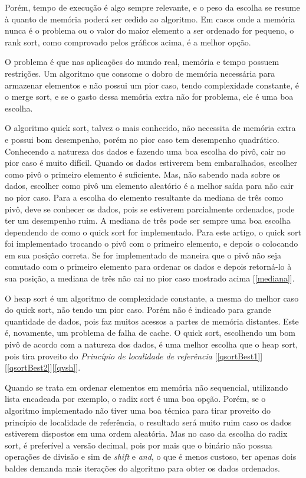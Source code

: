 \documentclass[fleqn,10pt]{SelfArx} %
\begin{document}
Porém, tempo de execução é algo sempre relevante, e o peso da escolha se resume à quanto de memória poderá ser 
cedido ao algoritmo. Em casos onde a memória nunca é o problema ou o valor do maior elemento a ser ordenado for 
pequeno, o rank sort, como comprovado pelos gráficos acima, é a melhor opção.

O problema é que nas aplicações do mundo real, memória e tempo possuem restrições. Um algoritmo que consome o dobro de 
memória necessária para armazenar elementos e não possui um pior caso, tendo complexidade constante, é o merge sort, e 
se o gasto dessa memória extra não for problema, ele é uma boa escolha. 

O algoritmo quick sort, talvez o mais conhecido, não necessita de memória extra e possui bom desempenho, porém no 
pior caso tem desempenho quadrático. Conhecendo a natureza dos dados e fazendo uma boa escolha do pivô, cair no 
pior caso é muito difícil. Quando os dados estiverem bem embaralhados, escolher como pivô o primeiro elemento é suficiente. 
Mas, não sabendo nada sobre os dados, escolher como pivô um elemento aleatório é a melhor saída para não cair no pior caso. 
Para a escolha do elemento resultante da mediana de três como pivô, deve se conhecer os dados, pois se estiverem 
parcialmente ordenados, pode ter um desempenho ruim. A mediana de três pode ser sempre uma boa escolha dependendo 
de como o quick sort for implementado. Para este artigo, o quick sort foi implementado trocando o pivô com o 
primeiro elemento, e depois o colocando em sua posição correta. Se for implementado de maneira que o pivô não seja comutado 
com o primeiro elemento para ordenar os dados e depois retorná-lo à sua posição, a mediana de três não cai no pior caso 
mostrado acima [\ref{mediana}].

O heap sort é um algoritmo de complexidade constante, a mesma do melhor caso do quick sort, não tendo um pior caso. 
Porém não é indicado para grande quantidade de dados, pois faz muitos acessos a partes de memória distantes. Este é, 
novamente, um problema de falha de cache. O quick sort, escolhendo um bom pivô de acordo com a natureza dos dados, é 
uma melhor escolha que o heap sort, pois tira proveito do \emph{Princípio de localidade de referência} [\ref{qsortBest1}]
[\ref{qsortBest2}][\ref{qvsh}].

Quando se trata em ordenar elementos em memória não sequencial, utilizando lista encadeada por exemplo, o radix sort 
é uma boa opção. Porém, se o algoritmo implementado não tiver uma boa técnica para tirar proveito do 
princípio de localidade de referência, o resultado será muito ruim caso os dados estiverem dispostos em uma ordem 
aleatória. Mas no caso da escolha do radix sort, é preferível a versão decimal, pois por mais que o binário 
não possua operações de divisão e sim de \emph{shift} e \emph{and}, o que é menos custoso, ter apenas dois baldes 
demanda mais iterações do algoritmo para obter os dados ordenados. 
\end{document}
